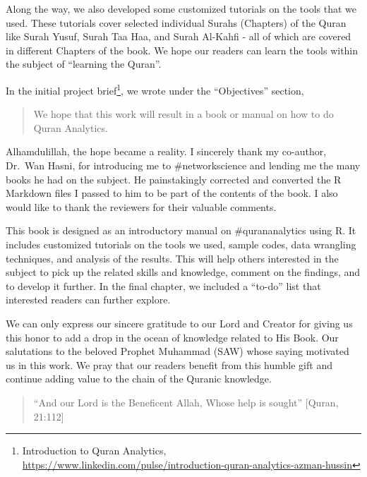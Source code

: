 \documentclass[
]{article}
\begin{document}
Along the way, we also developed some customized tutorials on the tools that we used. These tutorials cover selected individual Surahs (Chapters) of the Quran like Surah Yusuf, Surah Taa Haa, and Surah Al-Kahfi - all of which are covered in different Chapters of the book. We hope our readers can learn the tools within the subject of ``learning the Quran''.

In the initial project brief\footnote{Introduction to Quran Analytics, \url{https://www.linkedin.com/pulse/introduction-quran-analytics-azman-hussin}}, we wrote under the ``Objectives'' section,

\begin{quote}
We hope that this work will result in a book or manual on how to do Quran Analytics.
\end{quote}

Alhamdulillah, the hope became a reality. I sincerely thank my co-author, Dr.~Wan Hasni, for introducing me to \#networkscience and lending me the many books he had on the subject. He painstakingly corrected and converted the R Markdown files I passed to him to be part of the contents of the book. I also would like to thank the reviewers for their valuable comments.

This book is designed as an introductory manual on \#qurananalytics using R. It includes customized tutorials on the tools we used, sample codes, data wrangling techniques, and analysis of the results. This will help others interested in the subject to pick up the related skills and knowledge, comment on the findings, and to develop it further. In the final chapter, we included a ``to-do'' list that interested readers can further explore.

We can only express our sincere gratitude to our Lord and Creator for giving us this honor to add a drop in the ocean of knowledge related to His Book. Our salutations to the beloved Prophet Muhammad (SAW) whose saying motivated us in this work. We pray that our readers benefit from this humble gift and continue adding value to the chain of the Quranic knowledge.

\begin{quote}
``And our Lord is the Beneficent Allah, Whose help is sought'' {[}Quran, 21:112{]}
\end{quote}
\end{document}
